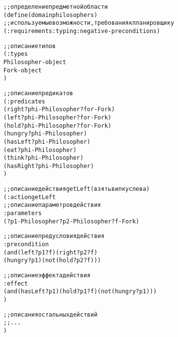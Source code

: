\begin{mdframed}[style=excode] 
\footnotesize
\begin{alltt} 
;; определение предметной области
(define (domain philosophers)
    ;; используемые возможности, требования к планировщику
    (:requirements :typing :negative-preconditions)

    ;; описание типов
    (:types
      Philosopher - object
      Fork - object
    )

    ;; описание предикатов
    (:predicates
      (right ?phi - Philosopher ?for - Fork)
      (left ?phi - Philosopher ?for - Fork)
      (hold ?phi - Philosopher ?for - Fork)
      (hungry ?phi - Philosopher)
      (hasLeft ?phi - Philosopher)
      (eat ?phi - Philosopher)
      (think ?phi - Philosopher)
      (hasRight ?phi - Philosopher)
    )

    ;; описание действия getLeft (взять вилку слева)
    (:action getLeft
      ;; описание параметров действия
      :parameters 
        (?p1 - Philosopher ?p2 - Philosopher ?f - Fork)

      ;; описание предусловия действия
      :precondition 
        (and (left ?p1 ?f) (right ?p2 ?f) 
             (hungry ?p1) (not (hold ?p2 ?f)))
      
      ;; описание эффекта действия
      :effect
        (and (hasLeft ?p1) (hold ?p1 ?f) (not (hungry ?p1)))
    )

    ;; описания остальных действий
    ;; ...
) 
\end{alltt} 
\end{mdframed}
